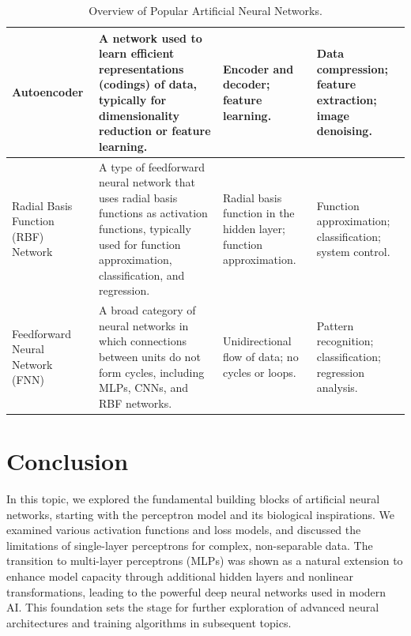 \documentclass[12pt]{article}
\begin{document}
\begin{landscape}
\begin{table}[ht]
\begin{tabular}{|p{3cm}|p{8cm}|p{5cm}|p{5cm}|}
\hline
Autoencoder & A network used to learn efficient representations (codings) of data, typically for dimensionality reduction or feature learning. & Encoder and decoder; feature learning. & Data compression; feature extraction; image denoising. \\
\hline
Radial Basis Function (RBF) Network & A type of feedforward neural network that uses radial basis functions as activation functions, typically used for function approximation, classification, and regression. & Radial basis function in the hidden layer; function approximation. & Function approximation; classification; system control. \\
\hline
Feedforward Neural Network (FNN) & A broad category of neural networks in which connections between units do not form cycles, including MLPs, CNNs, and RBF networks. & Unidirectional flow of data; no cycles or loops. & Pattern recognition; classification; regression analysis. \\
\hline
\end{tabular}
\caption{Overview of Popular Artificial Neural Networks.}
\label{table:ANNs}
\end{table}
\end{landscape}


\doublespacing	

\section{Conclusion}
In this topic, we explored the fundamental building blocks of artificial neural networks, starting with the perceptron model and its biological inspirations. We examined various activation functions and loss models, and discussed the limitations of single-layer perceptrons for complex, non-separable data. The transition to multi-layer perceptrons (MLPs) was shown as a natural extension to enhance model capacity through additional hidden layers and nonlinear transformations, leading to the powerful deep neural networks used in modern AI. This foundation sets the stage for further exploration of advanced neural architectures and training algorithms in subsequent topics.
\end{document}
